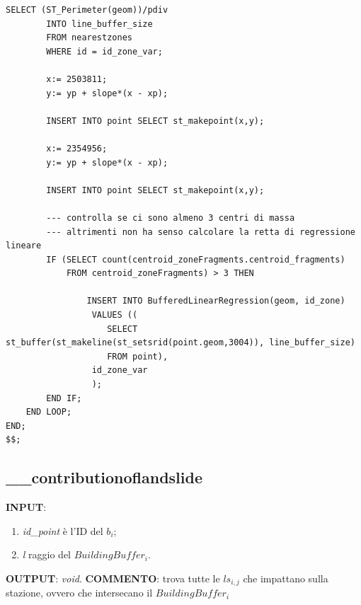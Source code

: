\begin{lstlisting}[style = mystyle]
		SELECT (ST_Perimeter(geom))/pdiv 
		INTO line_buffer_size 
		FROM nearestzones 
		WHERE id = id_zone_var;

		x:= 2503811;
		y:= yp + slope*(x - xp);

		INSERT INTO point SELECT st_makepoint(x,y);

		x:= 2354956;
		y:= yp + slope*(x - xp);

		INSERT INTO point SELECT st_makepoint(x,y);
		
		--- controlla se ci sono almeno 3 centri di massa 
		--- altrimenti non ha senso calcolare la retta di regressione lineare
		IF (SELECT count(centroid_zoneFragments.centroid_fragments) 
			FROM centroid_zoneFragments) > 3 THEN
			
				INSERT INTO BufferedLinearRegression(geom, id_zone)
				 VALUES ((
				 	SELECT st_buffer(st_makeline(st_setsrid(point.geom,3004)), line_buffer_size) 
				 	FROM point), 
				 id_zone_var
				 );
		END IF;
	END LOOP;
END;
$$;

\end{lstlisting}

\subsection{\_\_contributionoflandslide}
\textbf{INPUT}: 
\begin{enumerate}
	\item \textit{id\_point} è l'ID del $b_i$;
	\item \textit{l} raggio del $BuildingBuffer_i$.
\end{enumerate}
\textbf{OUTPUT}: \textit{void}. \newline
\textbf{COMMENTO}: trova tutte le $ls_{i,j}$ che impattano sulla stazione, ovvero che intersecano il $BuildingBuffer_i$

